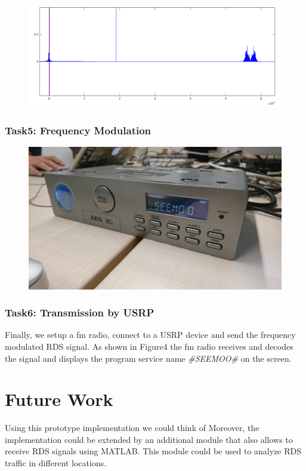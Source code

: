 \documentclass[sigconf]{acmart}
\begin{document}
\begin{figure}[tb!]
	\includegraphics[width=1\linewidth]{baseband_spectrum2.png}
	\caption{}
	\label{fig:rds_filt_plot}
\end{figure}

\hypertarget{Task5:ux20Frequencyux20Modulation}{%
\subsubsection{Task5: Frequency
Modulation}\label{Task5:ux20Frequencyux20Modulation}}

\begin{figure}[tb!]
	\includegraphics[width=1\linewidth]{radio_display.png}
	\caption{}
	\label{fig:rds_filt_plot}
\end{figure}


\hypertarget{Task6:ux20Transmission by USRPux20}{%
\subsubsection{Task6: Transmission by USRP}
\label{Task6:ux20Transmission by USRPux20}}
Finally, we setup a fm radio, connect to a USRP device and send the frequency modulated RDS signal.
As shown in Figure4 the fm radio receives and decodes the signal and displays the program service
name \textit{#SEEMOO#} on the screen.

\section{Future Work}
Using this prototype implementation we could think of 
Moreover, the implementation could be extended by an additional module that also allows to receive
RDS signals using MATLAB. This module could be used to analyze RDS traffic in different locations.




 
\end{document}
